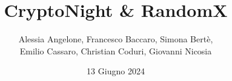 \documentclass{book}
\title{CryptoNight \& RandomX} %
\author{Alessia Angelone, Francesco Baccaro, Simona Bertè, \\ Emilio Cassaro, Christian Coduri, Giovanni Nicosia}
\date{13 Giugno 2024}
\begin{document}
\maketitle
\tableofcontents





\graphicspath{{./bozza/media/}}


\graphicspath{{./images/}}






\end{document}
